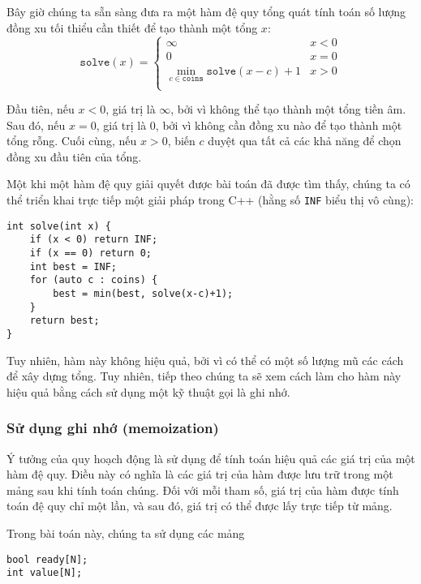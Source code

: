 Bây giờ chúng ta sẵn sàng đưa ra một hàm đệ quy tổng quát
tính toán số lượng đồng xu
tối thiểu cần thiết để tạo thành một tổng $x$:
\begin{equation*}
    \texttt{solve}(x) = \begin{cases}
               \infty               & x < 0\\
               0               & x = 0\\
               \min_{c \in \texttt{coins}} \texttt{solve}(x-c)+1 & x > 0 \\
           \end{cases}
\end{equation*}

Đầu tiên, nếu $x<0$, giá trị là $\infty$,
bởi vì không thể tạo thành một
tổng tiền âm.
Sau đó, nếu $x=0$, giá trị là $0$,
bởi vì không cần đồng xu nào để tạo thành một tổng rỗng.
Cuối cùng, nếu $x>0$, biến $c$ duyệt qua
tất cả các khả năng để chọn đồng xu đầu tiên
của tổng.

Một khi một hàm đệ quy giải quyết được bài toán
đã được tìm thấy,
chúng ta có thể triển khai trực tiếp một giải pháp trong C++
(hằng số \texttt{INF} biểu thị vô cùng):

\begin{lstlisting}
int solve(int x) {
    if (x < 0) return INF;
    if (x == 0) return 0;
    int best = INF;
    for (auto c : coins) {
        best = min(best, solve(x-c)+1);
    }
    return best;
}
\end{lstlisting}

Tuy nhiên, hàm này không hiệu quả,
bởi vì có thể có một số lượng mũ các cách
để xây dựng tổng.
Tuy nhiên, tiếp theo chúng ta sẽ xem cách làm cho
hàm này hiệu quả bằng cách sử dụng một kỹ thuật gọi là ghi nhớ.

\subsubsection{Sử dụng ghi nhớ (memoization)}


Ý tưởng của quy hoạch động là sử dụng
 để tính toán hiệu quả
các giá trị của một hàm đệ quy.
Điều này có nghĩa là các giá trị của hàm
được lưu trữ trong một mảng sau khi tính toán chúng.
Đối với mỗi tham số, giá trị của hàm
được tính toán đệ quy chỉ một lần, và sau đó,
giá trị có thể được lấy trực tiếp từ mảng.

Trong bài toán này, chúng ta sử dụng các mảng
\begin{lstlisting}
bool ready[N];
int value[N];
\end{lstlisting}

